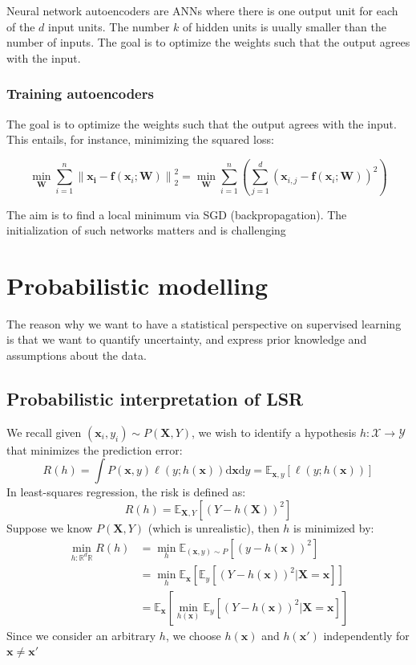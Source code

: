 \documentclass[a4paper,10pt,twoside]{article}
\newcommand\norm[1]{\left\lVert#1\right\rVert}
\begin{document}
Neural network autoencoders are ANNs where there is one output unit for each of the $d$ input units. The number $k$ of hidden units is uually smaller than the number of inputs. The goal is to optimize the weights such that the output agrees with the input.

\subsubsection{Training autoencoders}

The goal is to optimize the weights such that the output agrees with the input. This entails, for instance, minimizing the squared loss:

\begin{equation*}
    \min_{\mathbf{W}}\sum_{i=1}^{n}\norm{\mathbf{x_i}-\mathbf{f}(\mathbf{x}_i;\mathbf{W})}_2^2=\min_{\mathbf{W}}\sum_{i=1}^{n}(\sum_{j=1}^{d}(\mathbf{x}_{i,j}-\mathbf{f}(\mathbf{x}_i;\mathbf{W}))^2)
\end{equation*}

The aim is to find a local minimum via SGD (backpropagation). The initialization of such networks matters and is challenging

\section{Probabilistic modelling}

The reason why we want to have a statistical perspective on supervised learning is that we want to quantify uncertainty, and express prior knowledge and assumptions about the data.

\subsection{Probabilistic interpretation of LSR}

We recall given $(\mathbf{x}_i, y_i)\sim P(\mathbf{X},Y)$, we wish to identify a hypothesis $h:\mathcal{X\rightarrow \mathcal{Y}}$ that minimizes the prediction error:
\begin{equation*}
    R(h) = \int P(\mathbf{x},y)\ell(y;h(\mathbf{x}))\text{d}\mathbf{x}\text{d}y=\mathbb{E}_{\mathbf{x},y}[\ell(y;h(\mathbf{x}))]
\end{equation*}
In least-squares regression, the risk is defined as:
\begin{equation*}
    R(h) = \mathbb{E}_{\mathbf{X},Y}[(Y-h(\mathbf{X}))^2]
\end{equation*}
Suppose we know $P(\mathbf{X},Y)$ (which is unrealistic), then $h$ is minimized by:
\begin{align*}
    \min_{h:\mathbb{R}^d\mathbb{R}}R(h)&=\min_{h}\mathbb{E}_{(\mathbf{x},y)\sim P}[(y-h(\mathbf{x}))^2]\\
    &= \min_{h}\mathbb{E}_{\mathbf{x}}[\mathbb{E}_y[(Y-h(\mathbf{x}))^2|\mathbf{X}=\mathbf{x}]]\\
    &= \mathbb{E}_{\mathbf{x}}[\min_{h(\mathbf{x})}\mathbb{E}_{y}[(Y-h(\mathbf{x}))^2|\mathbf{X}=\mathbf{x}]]
\end{align*}
Since we consider an arbitrary $h$, we choose $h(\mathbf{x})$ and $h(\mathbf{x'})$ independently for $\mathbf{x}\neq\mathbf{x}'$
\end{document}
